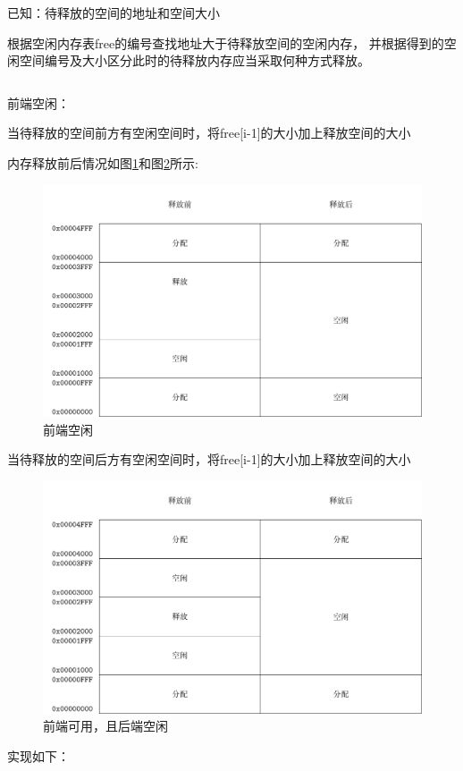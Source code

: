 已知：待释放的空间的地址和空间大小

根据空闲内存表free的编号查找地址大于待释放空间的空闲内存，
并根据得到的空闲空间编号及大小区分此时的待释放内存应当采取何种方式释放。
\begin{listing}[H]
  \inputminted[tabsize=2, firstline=91, lastline=95,
  linenos=true]{c}{../ZOS/src/kernel/memory.c}
\end{listing}

\newpage
前端空闲：

当待释放的空间前方有空闲空间时，将free[i-1]的大小加上释放空间的大小

内存释放前后情况如图\ref{fig:mem0}和图\ref{fig:mem1}所示: 

\begin{figure}[h]
  \centering
  \includegraphics[width=.8\textwidth]{fig/mem0.pdf}
  \caption{前端空闲}
  \label{fig:mem0}
\end{figure}

当待释放的空间后方有空闲空间时，将free[i-1]的大小加上释放空间的大小
\begin{figure}[h]
  \centering
  \includegraphics[width=.8\textwidth]{fig/mem1.pdf}
  \caption{前端可用，且后端空闲}
  \label{fig:mem1}
\end{figure}

\newpage
实现如下：

